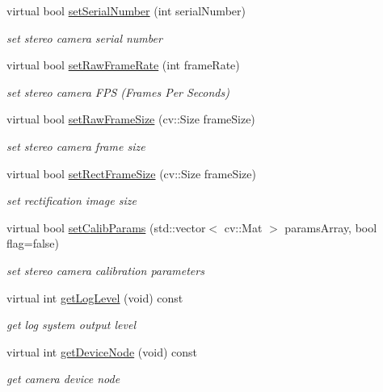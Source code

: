 \begin{DoxyCompactItemize}
virtual bool \hyperlink{class_stereo_camera_a110ad0dc21cea5bfa5607752fc858163}{set\+Serial\+Number} (int serial\+Number)
\begin{DoxyCompactList}\small\item\em set stereo camera serial number \end{DoxyCompactList}\item 
virtual bool \hyperlink{class_stereo_camera_aa28635e45b1d0ade5353a69e2a7175e4}{set\+Raw\+Frame\+Rate} (int frame\+Rate)
\begin{DoxyCompactList}\small\item\em set stereo camera F\+PS (Frames Per Seconds) \end{DoxyCompactList}\item 
virtual bool \hyperlink{class_stereo_camera_adb1ed69d226251cd050b1deab0270af8}{set\+Raw\+Frame\+Size} (cv\+::\+Size frame\+Size)
\begin{DoxyCompactList}\small\item\em set stereo camera frame size \end{DoxyCompactList}\item 
virtual bool \hyperlink{class_stereo_camera_ac2d8d3a96e0ac426af20a3e88df0167a}{set\+Rect\+Frame\+Size} (cv\+::\+Size frame\+Size)
\begin{DoxyCompactList}\small\item\em set rectification image size \end{DoxyCompactList}\item 
virtual bool \hyperlink{class_stereo_camera_a98d7546631507bcede3c9a850e69db7a}{set\+Calib\+Params} (std\+::vector$<$ cv\+::\+Mat $>$ params\+Array, bool flag=false)
\begin{DoxyCompactList}\small\item\em set stereo camera calibration parameters \end{DoxyCompactList}\item 
virtual int \hyperlink{class_stereo_camera_a105495e27d95f3f905ef1de0f9866c70}{get\+Log\+Level} (void) const
\begin{DoxyCompactList}\small\item\em get log system output level \end{DoxyCompactList}\item 
virtual int \hyperlink{class_stereo_camera_a34d50c8166cf8f3f76fff5789f8f1eee}{get\+Device\+Node} (void) const
\begin{DoxyCompactList}\small\item\em get camera device node \end{DoxyCompactList}\item 

\end{DoxyCompactItemize}
